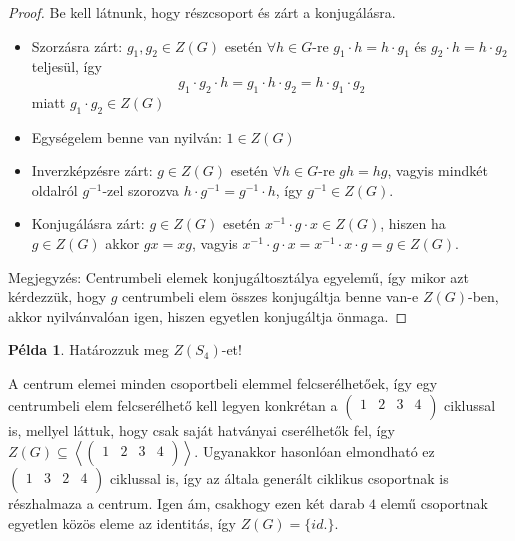 \documentclass[12pt]{book}
\theoremstyle{plain} %
\theoremstyle{definition} %
\newtheorem{pl}{Példa}[section]
\theoremstyle{remark}
\numberwithin{equation}{section}  %
\begin{document}
	\begin{proof}
		Be kell látnunk, hogy részcsoport és zárt a konjugálásra.
		
		\begin{itemize}
			\item Szorzásra zárt: $g_1, g_2 \in Z(G)$ esetén $\forall h\in G$-re $g_1\cdot h = h \cdot g_1$ és $g_2 \cdot h = h \cdot g_2$ teljesül, így
			\[ g_1 \cdot g_2 \cdot h = g_1 \cdot h \cdot g_2 = h \cdot g_1 \cdot g_2  \]
			miatt $g_1\cdot g_2 \in Z(G)$
			\item Egységelem benne van nyilván: $1\in Z(G)$
			\item Inverzképzésre zárt: $g\in Z(G)$ esetén $\forall h\in G$-re $gh=hg$, vagyis mindkét oldalról $g^{-1}$-zel szorozva $h\cdot g^{-1} = g^{-1} \cdot h$, így $g^{-1} \in Z(G)$.
			\item Konjugálásra zárt: $g\in Z(G)$ esetén $x^{-1} \cdot g \cdot x \in Z(G)$, hiszen ha $g\in Z(G)$ akkor $gx=xg$, vagyis $x^{-1}\cdot g \cdot x = x^{-1} \cdot x \cdot g = g \in Z(G)$.
		\end{itemize}
		Megjegyzés: Centrumbeli elemek konjugáltosztálya egyelemű, így mikor azt kérdezzük, hogy $g$ centrumbeli elem összes konjugáltja benne van-e $Z(G)$-ben, akkor nyilvánvalóan igen, hiszen egyetlen konjugáltja önmaga.
	\end{proof}
	
	\begin{pl}
		Határozzuk meg $Z(S_4)$-et!
		
		A centrum elemei minden csoportbeli elemmel felcserélhetőek, így egy centrumbeli elem felcserélhető kell legyen konkrétan a $\begin{pmatrix}
		1 & 2 & 3 & 4 \\
		\end{pmatrix}$ ciklussal is, mellyel láttuk, hogy csak saját hatványai cserélhetők fel, így $Z(G) \subseteq \left \langle \begin{pmatrix}
		1 & 2 & 3 & 4 \\
		\end{pmatrix} \right \rangle$. Ugyanakkor hasonlóan elmondható ez $\begin{pmatrix}
		1 & 3 & 2 & 4 \\
		\end{pmatrix}$ ciklussal is, így az általa generált ciklikus csoportnak is részhalmaza a centrum. Igen ám, csakhogy ezen két darab $4$ elemű csoportnak egyetlen közös eleme az identitás, így $Z(G) = \{id.\}$.
	\end{pl}
\end{document}
